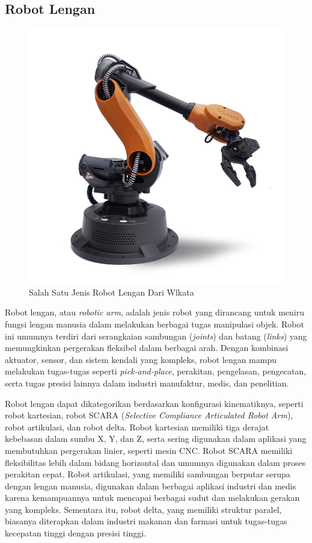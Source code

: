 \subsection{Robot Lengan}

\begin{figure} [H] \centering
  \includegraphics[scale=0.25]{gambar/arm_robot.png}
  \caption{Salah Satu Jenis Robot Lengan Dari Wlkata\parencite{img_ArmRobot}}
  \label{fig:arm_robot}
\end{figure}
Robot lengan, atau \emph{robotic arm}, adalah jenis robot yang dirancang untuk meniru fungsi lengan manusia
dalam melakukan berbagai tugas manipulasi objek. Robot ini umumnya terdiri dari serangkaian sambungan (\emph{joints})
dan batang (\emph{links}) yang memungkinkan pergerakan fleksibel dalam berbagai arah. Dengan kombinasi aktuator,
sensor, dan sistem kendali yang kompleks, robot lengan mampu melakukan tugas-tugas seperti \emph{pick-and-place},
perakitan, pengelasan, pengecatan, serta tugas presisi lainnya dalam industri manufaktur, medis, dan penelitian.

Robot lengan dapat dikategorikan berdasarkan konfigurasi kinematiknya, seperti robot kartesian,
robot SCARA (\emph{Selective Compliance Articulated Robot Arm}), robot artikulasi, dan robot delta.
Robot kartesian memiliki tiga derajat kebebasan dalam sumbu X, Y, dan Z, serta sering digunakan
dalam aplikasi yang membutuhkan pergerakan linier, seperti mesin CNC. Robot SCARA memiliki fleksibilitas
lebih dalam bidang horizontal dan umumnya digunakan dalam proses perakitan cepat. Robot artikulasi,
yang memiliki sambungan berputar serupa dengan lengan manusia, digunakan dalam berbagai aplikasi industri
dan medis karena kemampuannya untuk mencapai berbagai sudut dan melakukan gerakan yang kompleks.
Sementara itu, robot delta, yang memiliki struktur paralel, biasanya diterapkan dalam industri makanan
dan farmasi untuk tugas-tugas kecepatan tinggi dengan presisi tinggi.

